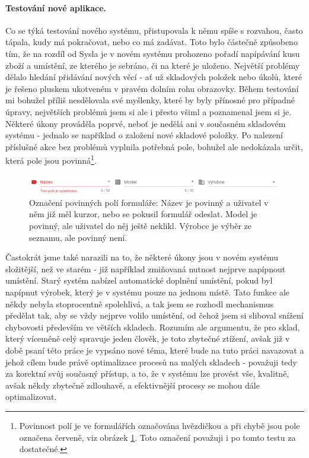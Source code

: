 \paragraph{Testování nové aplikace.} Co se týká testování nového systému, přistupovala k němu spíše s rozvahou, často tápala, kudy má pokračovat, nebo co má zadávat. Toto bylo částečně způsobeno tím, že na rozdíl od Sysla je v novém systému prohozeno pořadí napípávání kusu zboží a umístění, ze kterého je sebráno, či na které je uloženo. Největší problémy dělalo hledání přidávání nových věcí - ať už skladových položek nebo úkolů, které je řešeno pluskem ukotveném v pravém dolním rohu obrazovky. Během testování mi bohužel příliš nesdělovala své myšlenky, které by byly přínosné pro případné úpravy, největších problémů jsem si ale i přesto všiml a poznamenal jsem si je.\\
Některé úkony prováděla poprvé, neboť je nedělá ani v současném skladovém systému - jednalo se například o založení nové skladové položky. Po nalezení příslušné akce bez problémů vyplnila potřebná pole, bohužel ale nedokázala určit, která pole jsou povinná\footnote{Povinnost polí je ve formulářích označována hvězdičkou a při chybě jsou pole označena červeně, viz obrázek \ref{picture:test:required_fields}. Toto označení považuji i po tomto testu za dostatečné.}.\\

\begin{figure}[h]
\includegraphics[width=\textwidth]{../png/app_testing/required_fields.png}
\caption[Označení povinných polí formuláře]{Označení povinných polí formuláře: Název je povinný a uživatel v něm již měl kurzor, nebo se pokusil formulář odeslat. Model je povinný, ale uživatel do něj ještě neklikl. Výrobce je výběr ze seznamu, ale povinný není.} \label{picture:test:required_fields}
\end{figure}

Častokrát jsme také narazili na to, že některé úkony jsou v novém systému složitější, než ve starém - již například zmiňovaná nutnost nejprve napípnout umístění. Starý systém nabízel automatické doplnění umístění, pokud byl napípnut výrobek, který je v systému pouze na jednom místě. Tato funkce ale někdy nebyla stoprocentně spolehlivá, a tak jsem se rozhodl mechanismus předělat tak, aby se vždy nejprve volilo umístění, od čehož jsem si sliboval snížení chybovosti především ve větších skladech. Rozumím ale argumentu, že pro sklad, který víceméně celý spravuje jeden člověk, je toto zbytečné ztížení, avšak již v době psaní této práce je vypsáno nové téma, které bude na tuto práci navazovat a jehož cílem bude právě optimalizace procesů na malých skladech - považuji tedy za korektní svůj současný přístup, a to, že v systému lze provést vše, kvalitně, avšak někdy zbytečně zdlouhavě, a efektivnější procesy se mohou dále optimalizovat.

